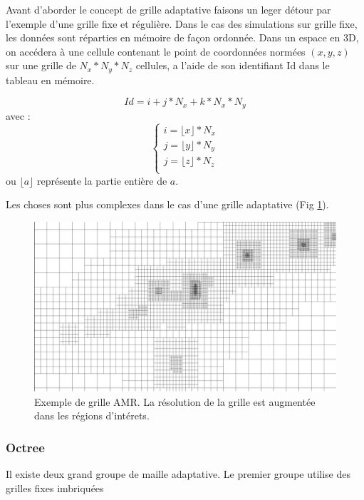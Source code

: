 Avant d'aborder le concept de grille adaptative faisons un leger détour par l'exemple d'une grille fixe et régulière.
Dans le cas des simulations sur grille fixe, les données sont réparties en mémoire de façon ordonnée.
Dans un espace en 3D, on accédera à une cellule contenant le point de coordonnées normées $(x,y,z)$ sur une grille de $N_x*N_y*N_z$ cellules, a l'aide de son identifiant Id dans le tableau en mémoire.

\begin{equation}
Id = i + j*N_x + k * N_x*N_y
\end{equation}
avec :
\begin{equation}
\begin{cases}
i=\lfloor x \rfloor *N_x \\
j=\lfloor y \rfloor*N_y \\
j=\lfloor z \rfloor*N_z \\
\end{cases}
\end{equation}
ou $\lfloor a \rfloor$ représente la partie entière de $a$.

Les choses sont plus complexes dans le cas d'une grille adaptative (Fig \ref{fig:AMR}).

\begin{figure}[bth]
        \includegraphics[width=.95\linewidth]{img/02/AMR.pdf} 
        \caption{Exemple de grille AMR. 
        La  résolution de la grille est augmentée dans les régions d'intérets.
}
 		\label{fig:AMR}
\end{figure}


\subsubsection{Octree}

Il existe deux grand groupe de maille adaptative.
Le premier groupe utilise des grilles fixes imbriquées %

